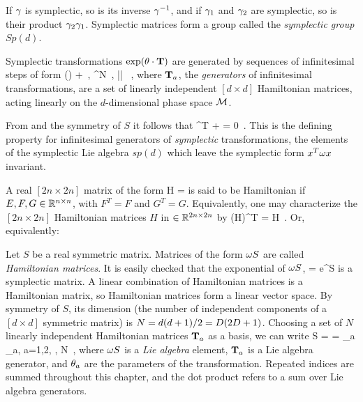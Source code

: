 If $\gamma$ is symplectic, so is its inverse $\gamma^{-1}$, and if
$\gamma_1$ and $\gamma_2$ are symplectic, so is their product $\gamma_2
\gamma_1$. Symplectic matrices form a group called the \emph{symplectic
group} $Sp(d)$.

{Symplectic} transformations $ \exp(\theta \cdot {\ensuremath{\mathbf{T}}}) $ are
generated by sequences of infinitesimal steps of form
\beq
\LieEl(\delta\gSpace)  + \delta \gSpace \cdot \Lg
    \,,\quad
\delta\gSpace \in \reals^N
    \,,\quad
|\delta \gSpace| 
    \, ,
where $\mathbf{T}_a$, the {\em generators} of infinitesimal
transformations, are a set of linearly independent
$[d\!\times\!d]$ Hamiltonian matrices,
acting linearly on the $d$-dim\-ens\-ion\-al
phase space ${\cal M}$.

From
 and
the symmetry of $S$
it follows that
\beq
 \Lg^T {\bf \omega} + {\bf \omega} \Lg = 0
\,.
This is the defining property for
infinitesimal generators of {\em symplectic}
transformations, the elements of the symplectic
Lie algebra $sp(d)$
which leave
the symplectic form $x^T {\bf \omega} x$ invariant.

A real $[\!2n\times\!2n]$ matrix of the form
\beq
H = 
is said to be Hamiltonian if $E, F, G \in \mathbb{R}^{n \times n}$,
 with $F^T = F$ and $G^T = G$. Equivalently, one
may characterize the $[\!2n\times\!2n]$  Hamiltonian matrices $H$
in $\in \mathbb{R}^{2n \times 2n}$ by
\beq
({\bf \omega}H)^T = {\bf \omega}H
\,.
Or, equivalently:

Let $S$ be a real symmetric matrix. Matrices of the form ${\bf \omega}S$ are
called \emph{Hamiltonian matrices}. It is easily checked that
the exponential of
${\bf \omega}S$,
\beq
\LieEl = e^{{\bf \omega}S}
is a symplectic matrix.
A linear combination  of
Hamiltonian matrices is a Hamiltonian matrix, so
Hamiltonian matrices form a linear vector space. By symmetry of
$S$, its dimension (the number of independent components of a
$[\!d\times\! d]$ symmetric matrix) is
$N= d(d+1)/2 = D(2D+1)$. Choosing a set of $N$ linearly
independent Hamiltonian matrices $\mathbf{T}_a$ as a basis, we
can write
\beq
{\bf \omega}S
 = \gSpace \cdot \Lg  = \sum \gSpace_a \Lg_a,\; a=1,2, \cdots, N
\,,
where ${\bf \omega}S$
is a {\em Lie algebra} element,  $\mathbf{T}_a$ is a Lie algebra generator,
and $\theta_a$ are the parameters
of the transformation. Repeated indices are summed throughout this
chapter, and the dot product refers to a sum over
Lie algebra generators.

